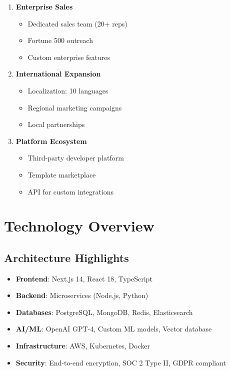 \begin{enumerate}
    \item \textbf{Enterprise Sales}
    \begin{itemize}
        \item Dedicated sales team (20+ reps)
        \item Fortune 500 outreach
        \item Custom enterprise features
    \end{itemize}
    
    \item \textbf{International Expansion}
    \begin{itemize}
        \item Localization: 10 languages
        \item Regional marketing campaigns
        \item Local partnerships
    \end{itemize}
    
    \item \textbf{Platform Ecosystem}
    \begin{itemize}
        \item Third-party developer platform
        \item Template marketplace
        \item API for custom integrations
    \end{itemize}
\end{enumerate}

\section{Technology Overview}

\subsection{Architecture Highlights}

\begin{itemize}
    \item \textbf{Frontend}: Next.js 14, React 18, TypeScript
    \item \textbf{Backend}: Microservices (Node.js, Python)
    \item \textbf{Databases}: PostgreSQL, MongoDB, Redis, Elasticsearch
    \item \textbf{AI/ML}: OpenAI GPT-4, Custom ML models, Vector database
    \item \textbf{Infrastructure}: AWS, Kubernetes, Docker
    \item \textbf{Security}: End-to-end encryption, SOC 2 Type II, GDPR compliant
\end{itemize}

